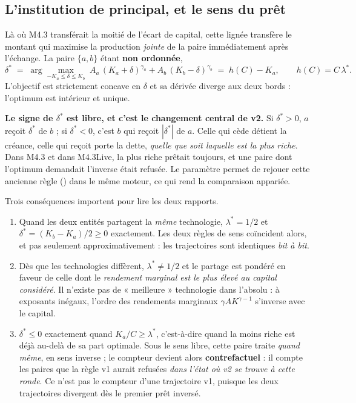 \subsection{L'institution de principal, et le sens du prêt}
\label{sec:sens}

Là où M4.3 transférait la moitié de l'écart de capital, cette lignée
transfère le montant qui maximise la production \emph{jointe} de la paire
immédiatement après l'échange. La paire $\{a,b\}$ étant \textbf{non
ordonnée},
\begin{equation}
\delta^{*} \;=\; \arg\max_{-K_a \le \delta \le K_b}\;
A_a\,(K_a+\delta)^{\gamma_a} + A_b\,(K_b-\delta)^{\gamma_b}
\;=\; h(C) - K_a,
\qquad h(C) = C\,\lambda^{*}.
\label{eq:transfert}
\end{equation}
L'objectif est strictement concave en $\delta$ et sa dérivée diverge aux deux
bords : l'optimum est intérieur et unique.

\textbf{Le signe de $\delta^{*}$ est libre, et c'est le changement central de
v2.} Si $\delta^{*} > 0$, $a$ reçoit $\delta^{*}$ de $b$ ; si
$\delta^{*} < 0$, c'est $b$ qui reçoit $|\delta^{*}|$ de $a$. Celle qui cède
détient la créance, celle qui reçoit porte la dette, \emph{quelle que soit
laquelle est la plus riche}. Dans M4.3 et dans M4.3Live, la plus riche prêtait
toujours, et une paire dont l'optimum demandait l'inverse était refusée. Le
paramètre  permet de rejouer cette ancienne règle
() dans le même moteur, ce qui rend la comparaison
appariée.

Trois conséquences importent pour lire les deux rapports.

\begin{enumerate}
\item Quand les deux entités partagent la \emph{même} technologie,
  $\lambda^{*} = 1/2$ et $\delta^{*} = (K_b-K_a)/2 \ge 0$ exactement. Les
  deux règles de sens coïncident alors, et pas seulement approximativement :
  les trajectoires sont identiques \emph{bit à bit}.
\item Dès que les technologies diffèrent, $\lambda^{*} \ne 1/2$ et le partage
  est pondéré en faveur de celle dont le \emph{rendement marginal est le plus
  élevé au capital considéré}. Il n'existe pas de « meilleure » technologie
  dans l'absolu : à exposants inégaux, l'ordre des rendements marginaux
  $\gamma A K^{\gamma-1}$ s'inverse avec le capital.
\item $\delta^{*} \le 0$ exactement quand $K_a / C \ge \lambda^{*}$,
  c'est-à-dire quand la moins riche est déjà au-delà de sa part optimale.
  Sous le sens libre, cette paire traite \emph{quand même}, en sens inverse ;
  le compteur  devient alors \textbf{contrefactuel} :
  il compte les paires que la règle v1 aurait refusées \emph{dans l'état où
  v2 se trouve à cette ronde}. Ce n'est pas le compteur d'une trajectoire v1,
  puisque les deux trajectoires divergent dès le premier prêt inversé.
\end{enumerate}

